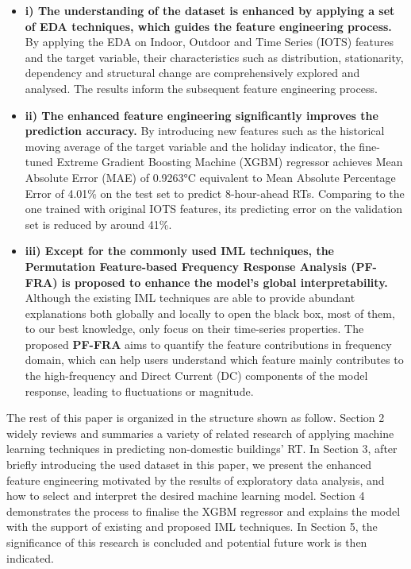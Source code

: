 \documentclass[11pt]{article}
\begin{document}
\begin{itemize}
	\item \textbf{i) The understanding of the dataset is enhanced by applying a set of EDA techniques, which guides the feature engineering process.} By applying the EDA on Indoor, Outdoor and Time Series (IOTS) features and the target variable, their characteristics such as distribution, stationarity, dependency and structural change are comprehensively explored and analysed. The results inform the subsequent feature engineering process.
	\item \textbf{ii) The enhanced feature engineering significantly improves the prediction accuracy.} By introducing new features such as the historical moving average of the target variable and the holiday indicator, the fine-tuned Extreme Gradient Boosting Machine (XGBM) regressor achieves Mean Absolute Error (MAE) of 0.9263°C equivalent to Mean Absolute Percentage Error of 4.01\% on the test set to predict 8-hour-ahead RTs. Comparing to the one trained with original IOTS features, its predicting error on the validation set is reduced by around 41\%.
	\item \textbf{iii) Except for the commonly used IML techniques, the \textbf{Permutation Feature-based Frequency Response Analysis (PF-FRA)} is proposed to enhance the model’s global interpretability.} Although the existing IML techniques are able to provide abundant explanations both globally and locally to open the black box, most of them, to our best knowledge, only focus on their time-series properties. The proposed \textbf{PF-FRA} aims to quantify the feature contributions in frequency domain, which can help users understand which feature mainly contributes to the high-frequency and Direct Current (DC) components of the model response, leading to fluctuations or magnitude.
\end{itemize}

The rest of this paper is organized in the structure shown as follow. Section 2 widely reviews and summaries a variety of related research of applying machine learning techniques in predicting non-domestic buildings’ RT. In Section 3, after briefly introducing the used dataset in this paper, we present the enhanced feature engineering motivated by the results of exploratory data analysis, and how to select and interpret the desired machine learning model. Section 4 demonstrates the process to finalise the XGBM regressor and explains the model with the support of existing and proposed IML techniques. In Section 5, the significance of this research is concluded and potential future work is then indicated.
\end{document}
